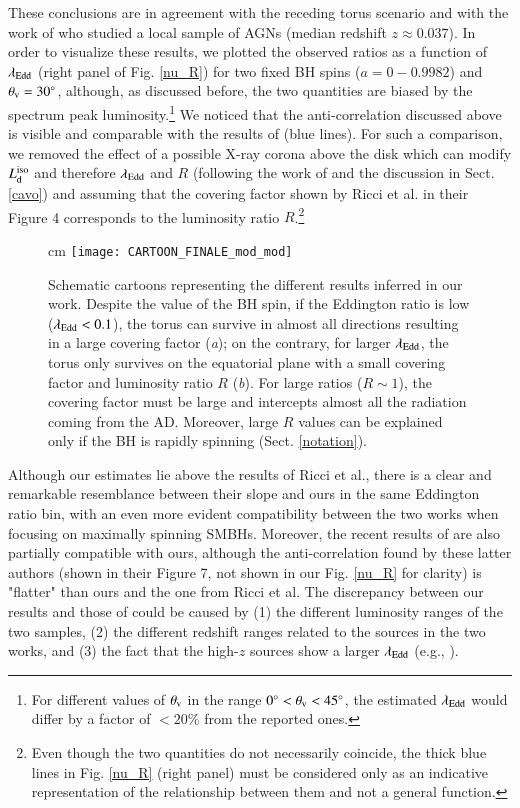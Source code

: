 \documentclass[]{aa}
\begin{document}
These conclusions are in agreement with the receding torus scenario and with the work of \citet{Ricci} who studied a local sample of AGNs (median redshift $z \approx 0.037$). In order to visualize these results, we plotted the observed ratios as a function of $\lambda_{\rm Edd}$ (right panel of Fig. \ref{nu_R}) for two fixed BH spins ($a=0 - 0.9982$) and $\theta_{\rm v} = 30^{\circ}$, although, as discussed before, the two quantities are biased by the spectrum peak luminosity.\footnote{For different values of $\theta_{\rm v}$ in the range $0^{\circ} < \theta_{\rm v} < 45^{\circ}$, the estimated $\lambda_{\rm Edd}$ would differ by a factor of $<20 \%$ from the reported ones.} We noticed that the anti-correlation discussed above is visible and comparable with the results of \citet{Ricci} (blue lines). For such a comparison, we removed the effect of a possible X-ray corona above the disk which can modify $L^{\rm iso}_{\rm d}$ and therefore $\lambda_{\rm Edd}$ and $R$ (following the work of \citet{Duras} and the discussion in Sect. \ref{cavo}) and assuming that the covering factor shown by Ricci et al. in their Figure 4 corresponds to the luminosity ratio $R$.\footnote{Even though the two quantities do not necessarily coincide, the thick blue lines in Fig. \ref{nu_R} (right panel) must be considered only as an indicative representation of the relationship between them and not a general function.}

\begin{figure*}
\centering
{} cm
\texttt{[image: CARTOON\_FINALE\_mod\_mod]}
\caption{Schematic cartoons representing the different results inferred in our work. Despite the value of the BH spin, if the Eddington ratio is low ($\lambda_{\rm Edd} < 0.1$), the torus can survive in almost all directions resulting in a large covering factor (\textit{a}); on the contrary, for larger $\lambda_{\rm Edd}$, the torus only survives on the equatorial plane with a small covering factor and luminosity ratio $R$ (\textit{b}). For large ratios ($R \sim 1$), the covering factor must be large and intercepts almost all the radiation coming from the AD. Moreover, large $R$ values can be explained only if the BH is rapidly spinning (Sect. \ref{notation}).} 
\label{cartoon_finale}
\end{figure*}

Although our estimates lie above the results of Ricci et al., there is a clear and remarkable resemblance between their slope and ours in the same Eddington ratio bin, with an even more evident compatibility between the two works when focusing on maximally spinning SMBHs. Moreover, the recent results of \citet{Toba} are also partially compatible with ours, although the anti-correlation found by these latter authors (shown in their Figure 7, not shown in our Fig. \ref{nu_R} for clarity) is "flatter" than ours and the one from Ricci et al. The discrepancy between our results and those of \citet{Ricci} could be caused by (1) the different luminosity ranges of the two samples, (2) the different redshift ranges related to the sources in the two works, and (3) the fact that the high-$z$ sources show a larger $\lambda_{\rm Edd}$ (e.g., \citealt{Lusso}).
\end{document}
